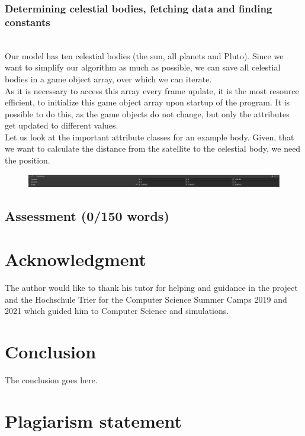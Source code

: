 \documentclass[conference,compsoc]{IEEEtran}
\begin{document}
\subsubsection{Determining celestial bodies, fetching data and finding constants} \hfill \\
Our model has ten celestial bodies (the sun, all planets and Pluto). Since we want to simplify our algorithm as much as possible, we can save all celestial bodies in a game object array, over which we can iterate. \\
As it is necessary to access this array every frame update, it is the most resource efficient, to initialize this game object array upon startup of the program. It is possible to do this, as the game objects do not change, but only the attributes get updated to different values. \\
Let us look at the important attribute classes for an example body. Given, that we want to calculate the distance from the satellite to the celestial body, we need the position.
\begin{figure}
	\includegraphics[width=\columnwidth]{Venus_vectors.png}
\end{figure}



\subsection{Assessment (0/150 words)}


\section*{Acknowledgment}
The author would like to thank his tutor for helping and guidance in the project and the Hochschule Trier for the Computer Science Summer Camps 2019 and 2021 which guided him to Computer Science and simulations.


\section{Conclusion}
The conclusion goes here.
\section{Plagiarism statement}
\end{document}
